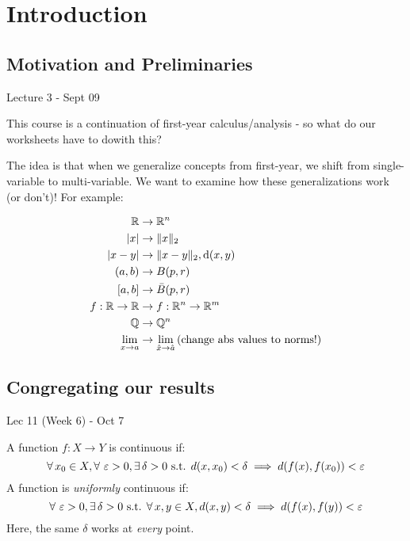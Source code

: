 \documentclass{article}
\begin{document}
\cover
\toc
\blurb

\section{Introduction}
\subsection{Motivation and Preliminaries}

Lecture 3 - Sept 09

This course is a continuation of first-year calculus/analysis - so what do our worksheets have to dowith this?

The idea is that when we generalize concepts from first-year, we shift from single-variable to multi-variable. We want to examine how these generalizations work (or don't)! For example:

\begin{align*}
    \mathbb{R} & \rightarrow \mathbb{R}^{n} \\
    \abs{x} & \rightarrow \|x\|_{2} \\
    \abs{x - y} & \rightarrow \|x - y\|_{2}, \textrm{d}(x, y) \\
    (a, b) & \rightarrow B(p, r) \\
    [a, b] & \rightarrow \bar{B}(p, r) \\
    f: \mathbb{R} \rightarrow \mathbb{R} & \rightarrow f: \mathbb{R}^{n} \rightarrow \mathbb{R}^{m} \\
    \mathbb{Q} & \rightarrow \mathbb{Q}^{n} \\
    \lim_{x \rightarrow a} & \rightarrow \lim_{\hat{x} \rightarrow \hat{a}} \textrm{(change abs values to norms!)}
\end{align*}

\subsection{Congregating our results}

Lec 11 (Week 6) - Oct 7

\begin{defn}
    A function $ f: X \rightarrow Y $ is continuous if:
    \begin{equation*}
        \forall \, x_{0} \in X, \forall \, \operatorname{\varepsilon} > 0, \exists \, \delta > 0 \textrm{ s.t. }
        d(x, x_{0}) < \delta \implies d(f(x), f(x_{0})) < \operatorname{\varepsilon}
    \end{equation*}
    A function is \textit{uniformly} continuous if:
    \begin{equation*}
        \forall \, \operatorname{\varepsilon} > 0, \exists \, \delta > 0 \textrm{ s.t. } \forall \, x, y \in X,
        d(x, y) < \delta \implies d(f(x), f(y)) < \operatorname{\varepsilon}
    \end{equation*}
    Here, the same $ \delta $ works at \textit{every} point.
\end{defn}
\end{document}
